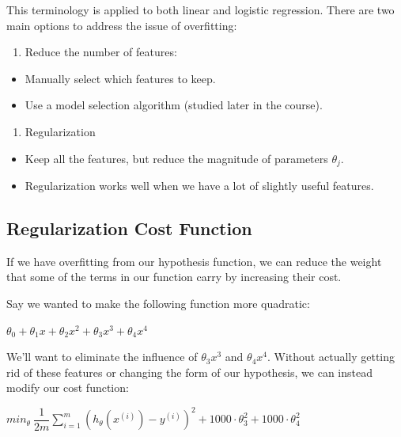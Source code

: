 \documentclass[
]{article}
\providecommand{\tightlist}{%
  \setlength{\itemsep}{0pt}\setlength{\parskip}{0pt}}
\begin{document}
This terminology is applied to both linear and logistic regression.
There are two main options to address the issue of overfitting:

\begin{enumerate}
\def\labelenumi{\arabic{enumi})}
\tightlist
\item
  Reduce the number of features:
\end{enumerate}

\begin{itemize}
\tightlist
\item
  Manually select which features to keep.
\item
  Use a model selection algorithm (studied later in the course).
\end{itemize}

\begin{enumerate}
\def\labelenumi{\arabic{enumi})}
\setcounter{enumi}{1}
\tightlist
\item
  Regularization
\end{enumerate}

\begin{itemize}
\tightlist
\item
  Keep all the features, but reduce the magnitude of parameters
  \(\theta_j\).
\item
  Regularization works well when we have a lot of slightly useful
  features.
\end{itemize}

\hypertarget{regularization-cost-function}{%
\subsection{Regularization Cost
Function}\label{regularization-cost-function}}

If we have overfitting from our hypothesis function, we can reduce the
weight that some of the terms in our function carry by increasing their
cost.

Say we wanted to make the following function more quadratic:

\(\theta_0 + \theta_1x + \theta_2x^2 + \theta_3x^3 + \theta_4x^4\)

We'll want to eliminate the influence of \(\theta_3x^3\) and
\(\theta_4x^4\). Without actually getting rid of these features or
changing the form of our hypothesis, we can instead modify our cost
function:

\(min_\theta\ \dfrac{1}{2m}\sum_{i=1}^m (h_\theta(x^{(i)}) - y^{(i)})^2 + 1000\cdot\theta_3^2 + 1000\cdot\theta_4^2\)
\end{document}
